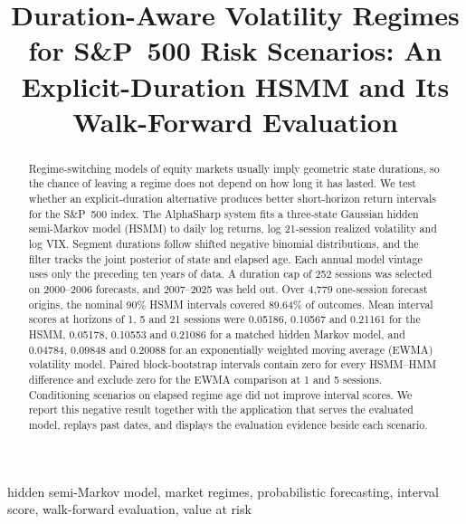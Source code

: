\documentclass[conference]{IEEEtran}
\begin{document}
\title{Duration-Aware Volatility Regimes for S\&P~500 Risk Scenarios: An Explicit-Duration HSMM and Its Walk-Forward Evaluation}

\author{
}

\maketitle

\begin{abstract}
Regime-switching models of equity markets usually imply geometric state durations, so the chance of leaving a regime does not depend on how long it has lasted. We test whether an explicit-duration alternative produces better short-horizon return intervals for the S\&P~500 index. The AlphaSharp system fits a three-state Gaussian hidden semi-Markov model (HSMM) to daily log returns, log 21-session realized volatility and log VIX. Segment durations follow shifted negative binomial distributions, and the filter tracks the joint posterior of state and elapsed age. Each annual model vintage uses only the preceding ten years of data. A duration cap of 252 sessions was selected on 2000--2006 forecasts, and 2007--2025 was held out. Over 4,779 one-session forecast origins, the nominal 90\% HSMM intervals covered 89.64\% of outcomes. Mean interval scores at horizons of 1, 5 and 21 sessions were 0.05186, 0.10567 and 0.21161 for the HSMM, 0.05178, 0.10553 and 0.21086 for a matched hidden Markov model, and 0.04784, 0.09848 and 0.20088 for an exponentially weighted moving average (EWMA) volatility model. Paired block-bootstrap intervals contain zero for every HSMM--HMM difference and exclude zero for the EWMA comparison at 1 and 5 sessions. Conditioning scenarios on elapsed regime age did not improve interval scores. We report this negative result together with the application that serves the evaluated model, replays past dates, and displays the evaluation evidence beside each scenario.
\end{abstract}

\begin{IEEEkeywords}
hidden semi-Markov model, market regimes, probabilistic forecasting, interval score, walk-forward evaluation, value at risk
\end{IEEEkeywords}
\end{document}
